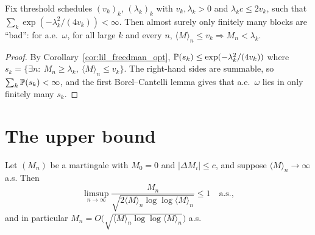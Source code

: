 \begin{lemma}\label{lem:lil_bc}
\leanok
{}
Fix threshold schedules $(v_k)_{k}$, $(\lambda_k)_k$ with $v_k,\lambda_k>0$ and
$\lambda_k c\le 2v_k$, such that $\sum_k \exp(-\lambda_k^2/(4v_k))<\infty$. Then almost
surely only finitely many blocks are ``bad'': for a.e.\ $\omega$, for all large $k$ and
every $n$, $\langle M\rangle_n\le v_k \Rightarrow M_n < \lambda_k$.
\end{lemma}

\begin{proof}\leanok
{}
By Corollary~\ref{cor:lil_freedman_opt}, $\mathbb{P}(s_k)\le\exp(-\lambda_k^2/(4v_k))$ where
$s_k=\{\exists n:\ M_n\ge\lambda_k,\ \langle M\rangle_n\le v_k\}$. The right-hand sides are
summable, so $\sum_k\mathbb{P}(s_k)<\infty$, and the first Borel--Cantelli lemma gives that a.e.\
$\omega$ lies in only finitely many $s_k$.
\end{proof}

\section{The upper bound}
\label{sec:pre_lil_upper}

\begin{theorem}\label{thm:lil_bounded}
\uses{lem:lil_bc}
Let $(M_n)$ be a martingale with $M_0=0$ and $|\Delta M_i|\le c$, and suppose
$\langle M\rangle_n \to \infty$ a.s. Then
\[
  \limsup_{n\to\infty}
  \frac{M_n}{\sqrt{2\langle M\rangle_n \log\log\langle M\rangle_n}} \le 1
  \quad\text{a.s.},
\]
and in particular $M_n = O\!\big(\sqrt{\langle M\rangle_n \log\log\langle M\rangle_n}\big)$
a.s.
\end{theorem}

